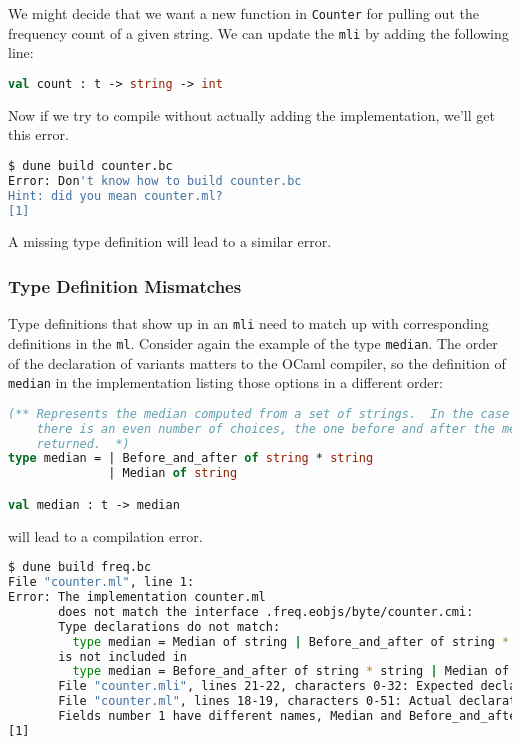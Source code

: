 We might decide that we want a new function in
\passthrough{\lstinline!Counter!} for pulling out the frequency count of
a given string. We can update the \passthrough{\lstinline!mli!} by
adding the following line:

\begin{lstlisting}[language=Caml]
val count : t -> string -> int
\end{lstlisting}

Now if we try to compile without actually adding the implementation,
we'll get this error.

\begin{lstlisting}[language=bash]
$ dune build counter.bc
Error: Don't know how to build counter.bc
Hint: did you mean counter.ml?
[1]
\end{lstlisting}

A missing type definition will lead to a similar error.

\hypertarget{type-definition-mismatches}{%
\subsubsection{Type Definition
Mismatches}\label{type-definition-mismatches}}

Type definitions that show up in an \passthrough{\lstinline!mli!} need
to match up with corresponding definitions in the
\passthrough{\lstinline!ml!}. Consider again the example of the type
\passthrough{\lstinline!median!}. The order of the declaration of
variants matters to the OCaml compiler, so the definition of
\passthrough{\lstinline!median!} in the implementation listing those
options in a different order:

\begin{lstlisting}[language=Caml]
(** Represents the median computed from a set of strings.  In the case where
    there is an even number of choices, the one before and after the median is
    returned.  *)
type median = | Before_and_after of string * string
              | Median of string

val median : t -> median
\end{lstlisting}

will lead to a compilation error.

\begin{lstlisting}[language=bash]
$ dune build freq.bc
File "counter.ml", line 1:
Error: The implementation counter.ml
       does not match the interface .freq.eobjs/byte/counter.cmi:
       Type declarations do not match:
         type median = Median of string | Before_and_after of string * string
       is not included in
         type median = Before_and_after of string * string | Median of string
       File "counter.mli", lines 21-22, characters 0-32: Expected declaration
       File "counter.ml", lines 18-19, characters 0-51: Actual declaration
       Fields number 1 have different names, Median and Before_and_after.
[1]
\end{lstlisting}


